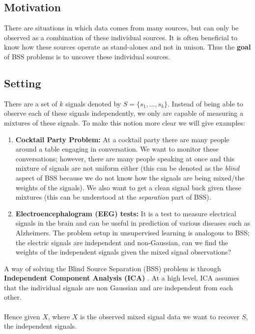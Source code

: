 \subsection{Motivation}
There are situations in which data comes from many sources, but can only be observed as a combination of these individual sources. It is often beneficial to know how these sources operate as stand-alones and not in unison. Thus the \textbf{goal} of BSS problems is to uncover these individual sources. 
\subsection{Setting}

There are a set of $k$ signals denoted by $S = \{ s_1, \dots, s_k\}$. Instead of being able to observe 
each of these signals independently, we only are capable of measuring a mixtures of these signals. To make
this notion more clear we will give examples: 
\begin{enumerate}
    \item \textbf{Cocktail Party Problem:} At a cocktail party there are many people around a table
    engaging in conversation. We want to monitor these conversations; however, there are many people
    speaking at once and this mixture of signals are not uniform either (this can be denoted as the
    \textit{blind} aspect of BSS because we do not know how the signals are being mixed/the weights of the
    signals). We also want to get a clean signal back given these mixtures (this can be understood at the
    \textit{separation} part of BSS).  
    \item \textbf{Electroencephalogram (EEG) tests:} It is a test to measure electrical signals in the brain and can be useful in prediction of various diseases such as Alzheimers. The problem setup in unsupervised learning is analogous to BSS; the electric signals are independent and non-Gaussian, can we find the weights of the independent signals given the mixed signal observations? 
\end{enumerate}
A way of solving the Blind Source Separation (BSS) problem is through \textbf{Independent Component Analysis (ICA) }. At a high level, ICA assumes that the individual signals are non Gaussian and are independent from each other. \\ \\
Hence given $X$, where $X$ is the observed mixed signal data we want to recover $S$, the independent signals. \\ \\
